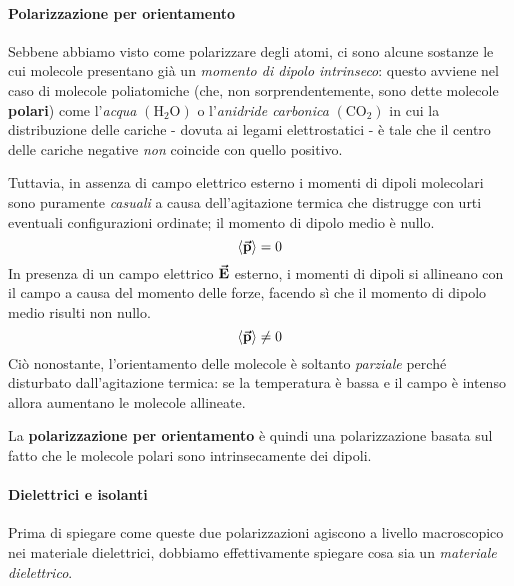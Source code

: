 \paragraph{Polarizzazione per orientamento}
Sebbene abbiamo visto come polarizzare degli atomi, ci sono alcune sostanze le cui molecole presentano già un \textit{momento di dipolo intrinseco}: questo avviene nel caso di molecole poliatomiche (che, non sorprendentemente, sono dette molecole \textbf{polari}) come l'\textit{acqua} $\left(\mathrm{H}_2\mathrm{O}\right)$ o l'\textit{anidride carbonica} $\left(\mathrm{CO}_2\right)$ in cui la distribuzione delle cariche - dovuta ai legami elettrostatici - è tale che il centro delle cariche negative \textit{non} coincide con quello positivo.

Tuttavia, in assenza di campo elettrico esterno i momenti di dipoli molecolari sono puramente \textit{casuali} a causa dell'agitazione termica che distrugge con urti eventuali configurazioni ordinate; il momento di dipolo medio è nullo.
\begin{equation*}
	\left<\vb*{\va{p}}\right>=0
\end{equation*}
In presenza di un campo elettrico $\vb*{\va{E}}$ esterno, i momenti di dipoli si allineano con il campo a causa del momento delle forze, facendo sì che il momento di dipolo medio risulti non nullo.
\begin{equation*}
	\left<\vb*{\va{p}}\right>\neq0
\end{equation*}
Ciò nonostante, l'orientamento delle molecole è soltanto \textit{parziale} perché disturbato dall'agitazione termica: se la temperatura è bassa e il campo è intenso allora aumentano le molecole allineate.

La \textbf{polarizzazione per orientamento} è quindi una polarizzazione basata sul fatto che le molecole polari sono intrinsecamente dei dipoli.
\paragraph{Dielettrici e isolanti}\label{defdielettrico}
Prima di spiegare come queste due polarizzazioni agiscono a livello macroscopico nei materiale dielettrici, dobbiamo effettivamente spiegare cosa sia un \textit{materiale dielettrico}.

